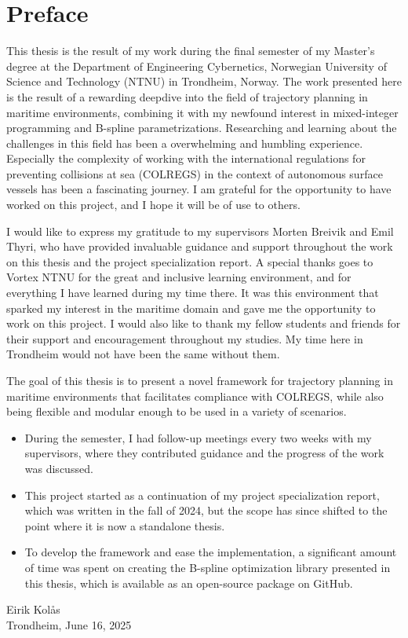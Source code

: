 
\section*{Preface}
\vspace{0.5cm}

This thesis is the result of my work during the final semester of my Master's degree at the Department of Engineering Cybernetics, Norwegian University of Science and Technology (NTNU) in Trondheim, Norway. The work presented here is the result of a rewarding deepdive into the field of trajectory planning in maritime environments, combining it with my newfound interest in mixed-integer programming and B-spline parametrizations. 
Researching and learning about the challenges in this field has been a overwhelming and humbling experience. Especially the complexity of working with the international regulations for preventing collisions at sea (COLREGS) in the context of autonomous surface vessels has been a fascinating journey.
I am grateful for the opportunity to have worked on this project, and I hope it will be of use to others.

I would like to express my gratitude to my supervisors Morten Breivik and Emil Thyri, who have provided invaluable guidance and support throughout the work on this thesis and the project specialization report. A special thanks goes to Vortex NTNU for the great and inclusive learning environment, and for everything I have learned during my time there. It was this environment that sparked my interest in the maritime domain and gave me the opportunity to work on this project. I would also like to thank my fellow students and friends for their support and encouragement throughout my studies. My time here in Trondheim would not have been the same without them. 

The goal of this thesis is to present a novel framework for trajectory planning in maritime environments that facilitates compliance with COLREGS, while also being flexible and modular enough to be used in a variety of scenarios. 
\begin{itemize}
    \item During the semester, I had follow-up meetings every two weeks with my supervisors, where they contributed guidance and the progress of the work was discussed.
    \item This project started as a continuation of my project specialization report, which was written in the fall of 2024, but the scope has since shifted to the point where it is now a standalone thesis. 
    \item To develop the framework and ease the implementation, a significant amount of time was spent on creating the B-spline optimization library presented in this thesis, which is available as an open-source package on GitHub. 
\end{itemize}    


\begin{center}
    \vspace{1cm}
    Eirik Kolås\\
    Trondheim, June 16, 2025
\end{center}


\cleardoublepage